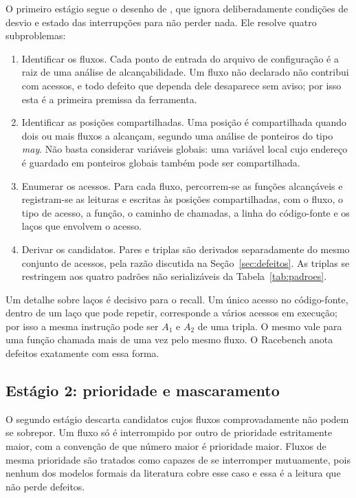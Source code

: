 O primeiro estágio segue o desenho de , que ignora
deliberadamente condições de desvio e estado das interrupções para não perder
nada. Ele resolve quatro subproblemas:

\begin{enumerate}
  \item Identificar os fluxos. Cada ponto de entrada do arquivo de
    configuração é a raiz de uma análise de alcançabilidade. Um fluxo não
    declarado não contribui com acessos, e todo defeito que dependa dele
    desaparece sem aviso; por isso esta é a primeira premissa da ferramenta.
  \item Identificar as posições compartilhadas. Uma posição é
    compartilhada quando dois ou mais fluxos a alcançam, segundo uma análise de
    ponteiros do tipo \textit{may}. Não basta considerar variáveis globais: uma
    variável local cujo endereço é guardado em ponteiros globais também pode ser
    compartilhada.
  \item Enumerar os acessos. Para cada fluxo, percorrem-se as funções
    alcançáveis e registram-se as leituras e escritas às posições
    compartilhadas, com o fluxo, o tipo de acesso, a função, o caminho de
    chamadas, a linha do código-fonte e os laços que envolvem o acesso.
  \item Derivar os candidatos. Pares e triplas são derivados
    separadamente do mesmo conjunto de acessos, pela razão discutida na
    Seção~\ref{sec:defeitos}. As triplas se restringem aos quatro padrões não
    serializáveis da Tabela~\ref{tab:padroes}.
\end{enumerate}

Um detalhe sobre laços é decisivo para o recall. Um único acesso no código-fonte,
dentro de um laço que pode repetir, corresponde a vários acessos em execução;
por isso a mesma instrução pode ser $A_1$ e $A_2$ de uma tripla. O mesmo vale
para uma função chamada mais de uma vez pelo mesmo fluxo. O Racebench anota
defeitos exatamente com essa forma.

\subsection{Estágio 2: prioridade e mascaramento}

O segundo estágio descarta candidatos cujos fluxos comprovadamente não podem se
sobrepor. Um fluxo só é interrompido por outro de prioridade estritamente
maior, com a convenção de que número maior é prioridade maior. Fluxos de mesma
prioridade são tratados como capazes de se interromper mutuamente, pois nenhum
dos modelos formais da literatura cobre esse caso e essa é a leitura que não
perde defeitos.

